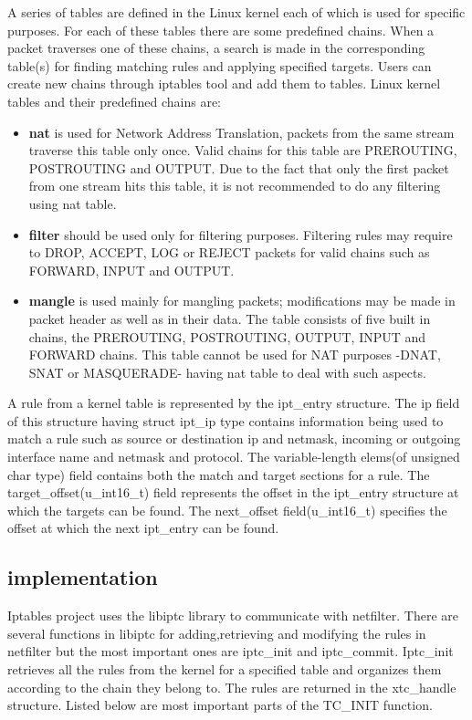{{A series of tables are defined in the Linux kernel each of which is used for specific purposes. For each of these tables there are some predefined chains. When a packet traverses one of these chains, a search is made in the corresponding table(s) for finding matching rules and applying specified targets. Users can create new chains through iptables tool and add them to tables.
Linux kernel tables and their predefined chains are:       
\begin{itemize}
\item {\bf nat} is used for Network Address Translation, packets from the same stream traverse this table only once. Valid chains for this table are PREROUTING, POSTROUTING and OUTPUT. Due to the fact that only the first packet from one stream hits this table, it is not recommended to do any filtering using nat table.
\item {\bf filter} should be used only for filtering purposes. Filtering rules may require to DROP, ACCEPT, LOG or REJECT packets for valid chains such as FORWARD, INPUT and OUTPUT.
\item {\bf mangle} is used mainly for mangling packets; modifications may be made in packet header as well as in their data. The table consists of five built in chains, the PREROUTING, POSTROUTING, OUTPUT, INPUT and FORWARD chains. This table cannot be used for NAT purposes -DNAT, SNAT or MASQUERADE- having nat table to deal with such aspects. 
\end{itemize}

A rule from a kernel table is represented by the ipt_entry structure. The ip field of this structure having struct ipt_ip type  contains information being used to match a rule such as source or destination ip and netmask, incoming or outgoing interface name and netmask and protocol. The variable-length elems(of unsigned char type) field contains both the match and target sections for a rule. The target_offset(u_int16_t) field represents the offset in the ipt_entry structure at which the targets can be found. The next_offset field(u_int16_t) specifies the offset at which the next ipt_entry can be found.   

\subsection{\project implementation}
\label{sub-sec:nat-lklnet}
Iptables project uses the libiptc library to communicate with netfilter. There are several functions in libiptc for adding,retrieving and modifying the rules in netfilter but the most important ones are iptc_init and iptc_commit. 
Iptc_init retrieves all the rules from the kernel for a specified table and organizes them according to the chain they belong to. The rules are returned in the xtc_handle structure. Listed below are most important parts of the TC_INIT function.

}}
